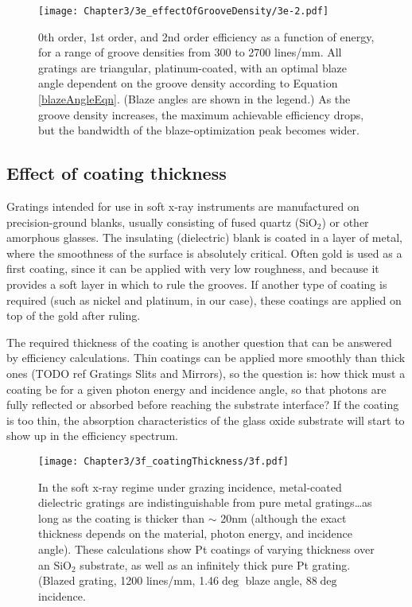 \begin{figure}[htbp] %
   \centering
   \texttt{[image: Chapter3/3e\_effectOfGrooveDensity/3e-2.pdf]} 
   \caption{0th order, 1st order, and 2nd order efficiency as a function of energy, for a range of groove densities from 300 to 2700 lines/mm.  All gratings are triangular, platinum-coated, with an optimal blaze angle dependent on the groove density according to Equation \ref{blazeAngleEqn}.  (Blaze angles are shown in the legend.)  As the groove density increases, the maximum achievable efficiency drops, but the bandwidth of the blaze-optimization peak becomes wider.}
   \label{3e-2}
\end{figure}

\subsection{Effect of coating thickness}
Gratings intended for use in soft x-ray instruments are manufactured on precision-ground  blanks, usually consisting of fused quartz (SiO$_2$) or other amorphous glasses.  The insulating (dielectric) blank is coated in a layer of metal, where the smoothness of the surface is absolutely critical.  Often gold is used as a first coating, since it can be applied with very low roughness, and because it provides a soft layer in which to rule the grooves.  If another type of coating is required (such as nickel and platinum, in our case), these coatings are applied on top of the gold after ruling.

The required thickness of the coating is another question that can be answered by efficiency calculations.   Thin coatings can be applied more smoothly than thick ones (TODO ref Gratings Slits and Mirrors), so the question is: how thick must a coating be for a given photon energy and incidence angle, so that photons are fully reflected or absorbed before reaching the substrate interface?  If the coating is too thin, the absorption characteristics of the glass oxide substrate will start to show up in the efficiency spectrum.

\begin{figure}[htbp] %
   \centering
   \texttt{[image: Chapter3/3f\_coatingThickness/3f.pdf]} 
   \caption{In the soft x-ray regime under grazing incidence, metal-coated dielectric gratings are indistinguishable from pure metal gratings\ldots as long as the coating is thicker than $\sim$ 20nm (although the exact thickness depends on the material, photon energy, and incidence angle).  These calculations show Pt coatings of varying thickness over an SiO$_2$ substrate, as well as an infinitely thick pure Pt grating.  (Blazed grating, 1200 lines/mm, 1.46$\deg$ blaze angle, 88$\deg$ incidence.}
   \label{3f}
\end{figure}

